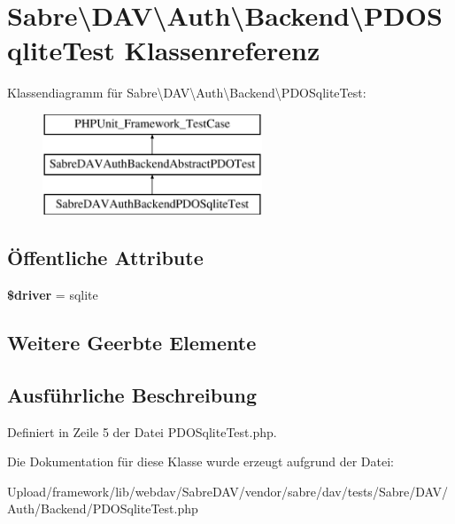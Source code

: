 \hypertarget{class_sabre_1_1_d_a_v_1_1_auth_1_1_backend_1_1_p_d_o_sqlite_test}{}\section{Sabre\textbackslash{}D\+AV\textbackslash{}Auth\textbackslash{}Backend\textbackslash{}P\+D\+O\+Sqlite\+Test Klassenreferenz}
\label{class_sabre_1_1_d_a_v_1_1_auth_1_1_backend_1_1_p_d_o_sqlite_test}
Klassendiagramm für Sabre\textbackslash{}D\+AV\textbackslash{}Auth\textbackslash{}Backend\textbackslash{}P\+D\+O\+Sqlite\+Test\+:\begin{figure}[H]
\begin{center}
\leavevmode
\includegraphics[height=3.000000cm]{class_sabre_1_1_d_a_v_1_1_auth_1_1_backend_1_1_p_d_o_sqlite_test}
\end{center}
\end{figure}
\subsection*{Öffentliche Attribute}
\begin{DoxyCompactItemize}
\item 
\mbox{\label{class_sabre_1_1_d_a_v_1_1_auth_1_1_backend_1_1_p_d_o_sqlite_test_a5998d0d2efde61970978c672fc1a209c}} 
{\bfseries \$driver} = \textquotesingle{}sqlite\textquotesingle{}
\end{DoxyCompactItemize}
\subsection*{Weitere Geerbte Elemente}


\subsection{Ausführliche Beschreibung}


Definiert in Zeile 5 der Datei P\+D\+O\+Sqlite\+Test.\+php.



Die Dokumentation für diese Klasse wurde erzeugt aufgrund der Datei\+:\begin{DoxyCompactItemize}
\item 
Upload/framework/lib/webdav/\+Sabre\+D\+A\+V/vendor/sabre/dav/tests/\+Sabre/\+D\+A\+V/\+Auth/\+Backend/P\+D\+O\+Sqlite\+Test.\+php\end{DoxyCompactItemize}
